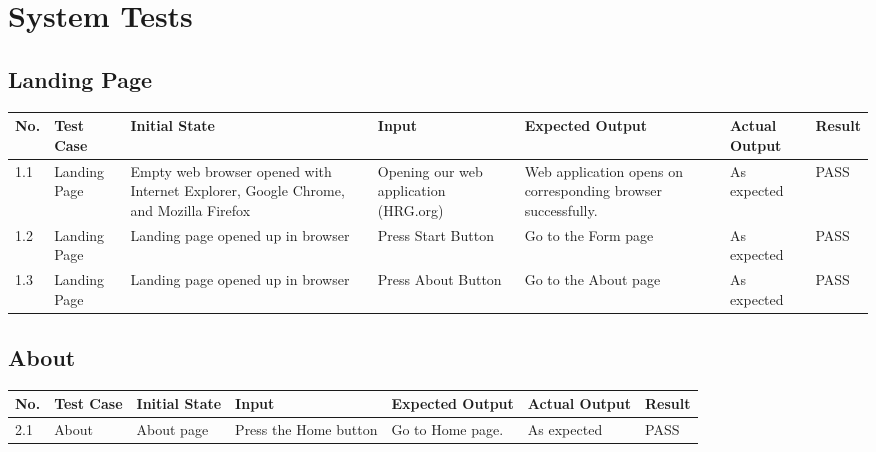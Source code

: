 \documentclass[12pt]{article}
\begin{document}
\section{System Tests}
\subsection{Landing Page}
    \begin{tabular}{ |p{0.5cm}|p{1.5cm}|p{3cm}|p{2cm}|p{2.5cm}|p{2.5cm}|p{1cm}|}
    \hline
    \textbf{No.} & \textbf{Test Case} & \textbf{Initial State} & \textbf{Input} & \textbf{Expected Output} & \textbf{Actual Output} & \textbf{Result} \\ \hline
1.1 & Landing Page & Empty web browser opened with Internet Explorer, Google Chrome, and Mozilla Firefox & Opening our web application (HRG.org) & Web application opens on corresponding browser successfully. & As expected &  PASS \\ \hline
1.2 & Landing Page & Landing page opened up in browser & Press Start Button & Go to the Form page & As expected & PASS \\ \hline 1.3 & Landing Page & Landing page opened up in browser & Press About Button & Go to the About page & As expected & PASS \\ \hline
    \end{tabular}

\subsection{About}
\begin{center}
    \begin{tabular}{ |p{0.5cm}|p{1.5cm}|p{3cm}|p{2cm}|p{2.5cm}|p{2.5cm}|p{1cm}|}
    \hline
    \textbf{No.} & \textbf{Test Case} & \textbf{Initial State} & \textbf{Input} & \textbf{Expected Output} & \textbf{Actual Output} & \textbf{Result} \\ \hline
 2.1 & About & About page & Press the Home button & Go to Home page. & As expected &  PASS \\ \hline
    \end{tabular}
\end{center}
\newpage
\end{document}

